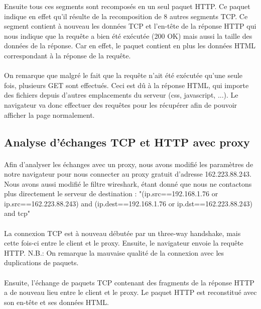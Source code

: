 Ensuite tous ces segments sont recomposés en un seul paquet HTTP. Ce paquet indique en effet qu'il résulte de la recomposition de 8 autres segments TCP. Ce segment contient à nouveau les données TCP et l'en-tête de la réponse HTTP qui nous indique que la requête a bien été exécutée (200 OK) mais aussi la taille des données de la réponse. Car en effet, le paquet contient en plus les données HTML correspondant à la réponse de la requête.  \linebreak
\paragraph{}
On remarque que malgré le fait que la requête n'ait été exécutée qu'une seule fois, plusieurs GET sont effectués. Ceci est dû à la réponse HTML, qui importe des fichiers depuis d'autres emplacements du serveur (css, javascript, ...). Le navigateur va donc effectuer des requêtes pour les récupérer afin de pouvoir afficher la page normalement. \linebreak

\subsection{Analyse d'échanges TCP et HTTP avec proxy}
\paragraph{}
Afin d'analyser les échanges avec un proxy, nous avons modifié les paramètres de notre navigateur pour nous connecter au proxy gratuit d'adresse 162.223.88.243. Nous avons aussi modifié le filtre wireshark, étant donné que nous ne contactons plus directement le serveur de destination : "(ip.src==192.168.1.76 or ip.src==162.223.88.243) and (ip.dest==192.168.1.76 or ip.dst==162.223.88.243) and tcp"\linebreak
\paragraph{}
La connexion TCP est à nouveau débutée par un three-way handshake, mais cette fois-ci entre le client et le proxy.
Ensuite, le navigateur envoie la requête HTTP. N.B.: On remarque la mauvaise qualité de la connexion avec les duplications de paquets.\linebreak
\paragraph{}
Ensuite, l'échange de paquets TCP contenant des fragments de la réponse HTTP a de nouveau lieu entre le client et le proxy. Le paquet HTTP est reconstitué avec son en-tête et ses données HTML.
